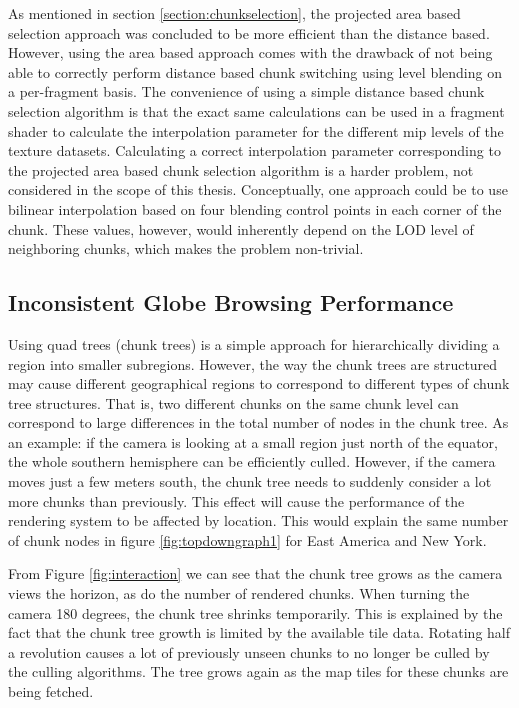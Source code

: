 As mentioned in section \ref{section:chunkselection}, the projected area based selection approach was concluded to be more efficient than the distance based. However, using the area based approach comes with the drawback of not being able to correctly perform distance based chunk switching using level blending on a per-fragment basis. The convenience of using a simple distance based chunk selection algorithm is that the exact same calculations can be used in a fragment shader to calculate the interpolation parameter for the different mip levels of the texture datasets. Calculating a correct interpolation parameter corresponding to the projected area based chunk selection algorithm is a harder problem, not considered in the scope of this thesis. Conceptually, one approach could be to use bilinear interpolation based on four blending control points in each corner of the chunk. These values, however, would inherently depend on the LOD level of neighboring chunks, which makes the problem non-trivial. 

\subsection{Inconsistent Globe Browsing Performance}
Using quad trees (chunk trees) is a simple approach for hierarchically dividing a region into smaller subregions. 
However, the way the chunk trees are structured may cause different geographical regions to correspond to different types of chunk tree structures. 
That is, two different chunks on the same chunk level can correspond to large differences in the total number of nodes in the chunk tree. 
As an example: if the camera is looking at a small region just north of the equator, the whole southern hemisphere can be efficiently culled. 
However, if the camera moves just a few meters south, the chunk tree needs to suddenly consider a lot more chunks than previously. 
This effect will cause the performance of the rendering system to be affected by location. 
This would explain the same number of chunk nodes in figure \ref{fig:topdowngraph1} for East America and New York. 

From Figure \ref{fig:interaction} we can see that the chunk tree grows as the camera views the horizon, as do the number of rendered chunks. When turning the camera 180 degrees, the chunk tree shrinks temporarily. This is explained by the fact that the chunk tree growth is limited by the available tile data. Rotating half a revolution causes a lot of previously unseen chunks to no longer be culled by the culling algorithms. The tree grows again as the map tiles for these chunks are being fetched. 

